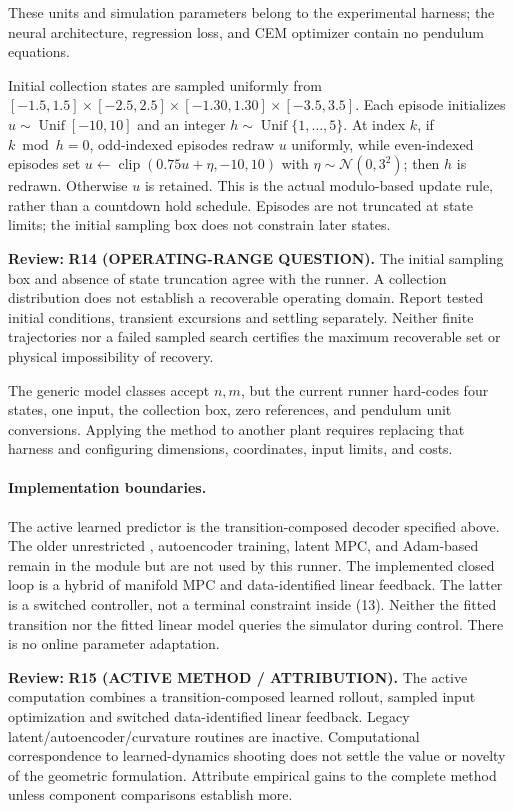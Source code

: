 \documentclass[11pt]{article}
\newcommand{\clip}{\operatorname{clip}}
\newcommand{\review}[1]{\par\noindent\textcolor{red!70!black}{\textbf{Review:} #1}\par}
\newcommand{\code}[1]{\texttt{\detokenize{#1}}}
\begin{document}
These units and simulation parameters belong to the experimental harness; the neural architecture, regression loss, and CEM optimizer contain no pendulum equations.

Initial collection states are sampled uniformly from $[-1.5,1.5]\times[-2.5,2.5]\times[-1.30,1.30]\times[-3.5,3.5]$. Each episode initializes $u\sim\operatorname{Unif}[-10,10]$ and an integer $h\sim\operatorname{Unif}\{1,\ldots,5\}$. At index $k$, if $k\bmod h=0$, odd-indexed episodes redraw $u$ uniformly, while even-indexed episodes set $u\leftarrow\clip(0.75u+\eta,-10,10)$ with $\eta\sim\mathcal N(0,3^2)$; then $h$ is redrawn. Otherwise $u$ is retained. This is the actual modulo-based update rule, rather than a countdown hold schedule. Episodes are not truncated at state limits; the initial sampling box does not constrain later states.
\review{\textbf{R14 (OPERATING-RANGE QUESTION).} The initial sampling box and absence of state truncation agree with the runner. A collection distribution does not establish a recoverable operating domain. Report tested initial conditions, transient excursions and settling separately. Neither finite trajectories nor a failed sampled search certifies the maximum recoverable set or physical impossibility of recovery.}


The generic model classes accept $n,m$, but the current runner hard-codes four states, one input, the collection box, zero references, and pendulum unit conversions. Applying the method to another plant requires replacing that harness and configuring dimensions, coordinates, input limits, and costs.

\paragraph{Implementation boundaries.}
The active learned predictor is the transition-composed decoder specified above. The older unrestricted \code{BehaviorDecoder}, autoencoder training, latent MPC, and Adam-based \code{DataDrivenMPCSolver} remain in the module but are not used by this runner. The implemented closed loop is a hybrid of manifold MPC and data-identified linear feedback. The latter is a switched controller, not a terminal constraint inside (13). Neither the fitted transition nor the fitted linear model queries the simulator during control. There is no online parameter adaptation.
\review{\textbf{R15 (ACTIVE METHOD / ATTRIBUTION).} The active computation combines a transition-composed learned rollout, sampled input optimization and switched data-identified linear feedback. Legacy latent/autoencoder/curvature routines are inactive. Computational correspondence to learned-dynamics shooting does not settle the value or novelty of the geometric formulation. Attribute empirical gains to the complete method unless component comparisons establish more.}
\end{document}
